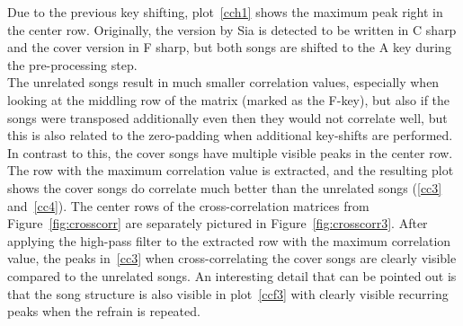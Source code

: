 \noindent Due to the previous key shifting, plot~\ref{cch1} shows the maximum peak right in the center row. Originally, the version by Sia is detected to be written in C sharp and the cover version in F sharp, but both songs are shifted to the A key during the pre-processing step.\\
\noindent The unrelated songs result in much smaller correlation values, especially when looking at the middling row of the matrix (marked as the F-key), but also if the songs were transposed additionally even then they would not correlate well, but this is also related to the zero-padding when additional key-shifts are performed. 
In contrast to this, the cover songs have multiple visible peaks in the center row. 
\noindent The row with the maximum correlation value is extracted, and the resulting plot shows the cover songs do correlate much better than the unrelated songs (\ref{cc3} and~\ref{cc4}).
The center rows of the cross-correlation matrices from Figure~\ref{fig:crosscorr} are separately pictured in Figure~\ref{fig:crosscorr3}. After applying the high-pass filter to the extracted row with the maximum correlation value, the peaks in~\ref{cc3} when cross-correlating the cover songs are clearly visible compared to the unrelated songs. An interesting detail that can be pointed out is that the song structure is also visible in plot~\ref{ccf3} with clearly visible recurring peaks when the refrain is repeated.
